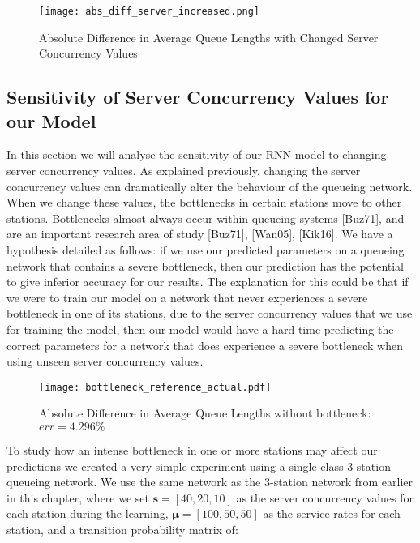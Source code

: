 \documentclass[a4paper,11pt,titlepage]{article}
\begin{document}
\begin{figure}[h!]
\begin{center}
\texttt{[image: abs\_diff\_server\_increased.png]}
\caption{Absolute Difference in Average Queue Lengths with Changed Server Concurrency Values}
\label{fig:abs_diff_concurrency}
\end{center}
\end{figure}

\subsection{Sensitivity of Server Concurrency Values for our Model}

In this section we will analyse the sensitivity of our RNN model to changing server concurrency values. As explained previously, changing the server concurrency values can dramatically alter the behaviour of the queueing network. When we change these values, the bottlenecks in certain stations move to other stations. Bottlenecks almost always occur within queueing systems [Buz71], and are an important research area of study [Buz71], [Wan05], [Kik16].  We have a hypothesis detailed as follows: if we use our predicted parameters on a queueing network that contains a severe bottleneck, then our prediction has the potential to give inferior accuracy for our results. The explanation for this could be that if we were to train our model on a network that never experiences a severe bottleneck in one of its stations, due to the server concurrency values that we use for training the model, then our model would have a hard time predicting the correct parameters for a network that does experience a severe bottleneck when using unseen server concurrency values. \\

\begin{figure}[h!]
\begin{center}
\texttt{[image: bottleneck\_reference\_actual.pdf]}
\caption{Absolute Difference in Average Queue Lengths without bottleneck: $err = 4.296\%$}
\label{fig:bottleneck_reference}
\end{center}
\end{figure}

To study how an intense bottleneck in one or more stations may affect our predictions we created a very simple experiment using a single class 3-station queueing network. We use the same network as the 3-station network from earlier in this chapter, where we set $\mathbf{s} = [40,20,10]$ as the server concurrency values for each station during the learning,  $\bm{\mu} = [100,50,50]$ as the service rates for each station, and a transition probability matrix of: 
\end{document}
